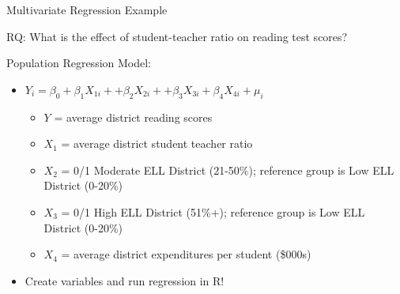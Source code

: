 \documentclass[
  8pt,
  ignorenonframetext,
  dvipsnames]{beamer}
\providecommand{\tightlist}{%
  \setlength{\itemsep}{0pt}\setlength{\parskip}{0pt}}
\let\olditem\item
\renewcommand{\item}{%
  \olditem\vspace{4pt}
}
\begin{document}
\begin{frame}{Multivariate Regression Example}
\protect\hypertarget{multivariate-regression-example-1}{}

RQ: What is the effect of student-teacher ratio on reading test scores?

\medskip

Population Regression Model:

\begin{itemize}
\tightlist
\item
  \(Y_i = \beta_0 + \beta_1X_{1i} + + \beta_2X_{2i} + + \beta_3X_{3i} + \beta_4X_{4i} + \mu_i\)

  \begin{itemize}
  \tightlist
  \item
    \(Y\) = average district reading scores
  \item
    \(X_{1}\) = average district student teacher ratio
  \item
    \(X_{2}\) = 0/1 Moderate ELL District (21-50\%); reference group is
    Low ELL District (0-20\%)
  \item
    \(X_{3}\) = 0/1 High ELL District (51\%+); reference group is Low
    ELL District (0-20\%)
  \item
    \(X_{4}\) = average district expenditures per student (\$000s)
  \end{itemize}
\item
  Create variables and run regression in R!
\end{itemize}

\end{frame}
\end{document}
